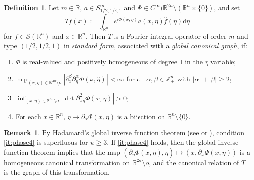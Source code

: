 \documentclass{amsart}
\newcommand {\ud}{\mathrm{d}}
\newcommand {\R}{\mathbb R}
\newcommand {\Rn}{\mathbb{R}^{n}}
\newcommand {\Sw}{\mathcal{S}}
\newcommand {\wh}{\widehat}
\newcommand {\Z}{\mathbb Z}
\theoremstyle{definition}
\newtheorem{definition}[theorem]{Definition}
\newtheorem{remark}[theorem]{Remark}
\numberwithin{equation}{section}
\begin{document}
\begin{definition}\label{def:operator}
Let $m\in\R$, $a\in S^{m}_{1/2,1/2,1}$ and $\Phi\in C^{\infty}(\R^{2n}\setminus (\Rn\times\{0\})$, and set
\begin{equation}\label{eq:oscint}
Tf(x):=\int_{\Rn}e^{i\Phi(x,\eta)}a(x,\eta)\wh{f}(\eta)\ud\eta
\end{equation}
for $f\in\Sw(\Rn)$ and $x\in \Rn$. Then $T$ is a Fourier integral operator of order $m$ and type $(1/2, 1/2, 1)$ in \emph{standard form}, associated with a \emph{global canonical graph}, if:
\begin{enumerate}
\item\label{it:phase1} $\Phi$ is real-valued and positively homogeneous of degree $1$ in the $\eta$ variable;
\item\label{it:phase2} $\sup_{(x,\eta)\in \R^{2n}\setminus o}|\partial_{x}^{\beta}\partial_{\eta}^{\alpha}\Phi(x,\hat{\eta})|<\infty$ for all $\alpha,\beta\in\Z_{+}^{n}$ with $|\alpha|+|\beta|\geq 2$;
\item\label{it:phase3} $\inf_{(x,\eta)\in \R^{2n}\setminus o}| \det \partial^2_{x \eta} \Phi (x,\eta)|>0$;
\item\label{it:phase4} For each $x\in\Rn$, $\eta\mapsto \partial_{x}\Phi(x,\eta)$ is a bijection on $\R^{n}\setminus \{0\}$.
\end{enumerate}
\end{definition}

\begin{remark}\label{rem:oscint} 
By Hadamard's global inverse function theorem (see \cite[Theorem 6.2.8]{Krantz-Parks13} {or \cite{Ruzhansky-Sugimoto15})}, condition \eqref{it:phase4} is superfluous for $n\geq3$. %
If \eqref{it:phase4} holds, then the global inverse function theorem implies that the map $(\partial_{\eta}\Phi(x,\eta),\eta)\mapsto (x,\partial_{x}\Phi(x,\eta))$ is a homogeneous canonical transformation on $\R^{2n}\setminus o$, and the canonical relation of $T$ is the graph of this transformation.
\end{remark}

\end{document}
